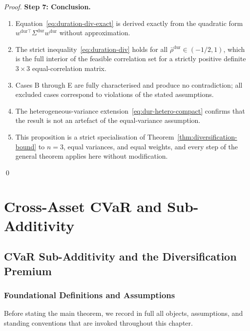 \documentclass[12pt,openany]{book}
\newcommand{\bfw}{\mathbf{w}}
\numberwithin{equation}{chapter}
\theoremstyle{plain}
\theoremstyle{definition}
\theoremstyle{remark}
\def\bfw{w}%
\begin{document}
\begin{proof}
\medskip
\noindent\textbf{Step 7: Conclusion.}

\begin{enumerate}
  \item Equation~\eqref{eq:duration-div-exact} is derived exactly
        from the quadratic form $\bfw^{\mathrm{dur}\top}
        \Sigma^{\mathrm{dur}}\bfw^{\mathrm{dur}}$ without
        approximation.
  \item The strict inequality~\eqref{eq:duration-div} holds for all
        $\bar{\rho}^{\mathrm{dur}} \in (-1/2, 1)$, which is the
        full interior of the feasible correlation set for a
        strictly positive definite $3\times 3$ equal-correlation
        matrix.
  \item Cases B through E are fully characterised and produce no
        contradiction; all excluded cases correspond to violations
        of the stated assumptions.
  \item The heterogeneous-variance extension~\eqref{eq:dur-hetero-compact}
        confirms that the result is not an artefact of the
        equal-variance assumption.
  \item This proposition is a strict specialisation of
        Theorem~\ref{thm:diversification-bound} to $n = 3$,
        equal variances, and equal weights, and every step of
        the general theorem applies here without modification.
\end{enumerate}
\qed
\end{proof}

\chapter{Cross-Asset CVaR and Sub-Additivity}
\label{ch:cvar}

\section{CVaR Sub-Additivity and the Diversification Premium}

\subsection{Foundational Definitions and Assumptions}

Before stating the main theorem, we record in full all objects,
assumptions, and standing conventions that are invoked throughout
this chapter.
\end{document}
